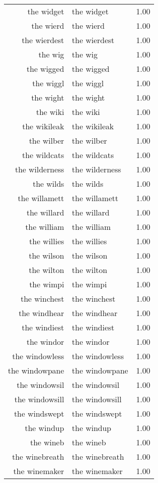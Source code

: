 \begin{table}[ht]
\begin{tabular}{rlr}
  the widget & the widget & 1.00 \\ 
  the wierd & the wierd & 1.00 \\ 
  the wierdest & the wierdest & 1.00 \\ 
  the wig & the wig & 1.00 \\ 
  the wigged & the wigged & 1.00 \\ 
  the wiggl & the wiggl & 1.00 \\ 
  the wight & the wight & 1.00 \\ 
  the wiki & the wiki & 1.00 \\ 
  the wikileak & the wikileak & 1.00 \\ 
  the wilber & the wilber & 1.00 \\ 
  the wildcats & the wildcats & 1.00 \\ 
  the wilderness & the wilderness & 1.00 \\ 
  the wilds & the wilds & 1.00 \\ 
  the willamett & the willamett & 1.00 \\ 
  the willard & the willard & 1.00 \\ 
  the william & the william & 1.00 \\ 
  the willies & the willies & 1.00 \\ 
  the wilson & the wilson & 1.00 \\ 
  the wilton & the wilton & 1.00 \\ 
  the wimpi & the wimpi & 1.00 \\ 
  the winchest & the winchest & 1.00 \\ 
  the windhear & the windhear & 1.00 \\ 
  the windiest & the windiest & 1.00 \\ 
  the windor & the windor & 1.00 \\ 
  the windowless & the windowless & 1.00 \\ 
  the windowpane & the windowpane & 1.00 \\ 
  the windowsil & the windowsil & 1.00 \\ 
  the windowsill & the windowsill & 1.00 \\ 
  the windswept & the windswept & 1.00 \\ 
  the windup & the windup & 1.00 \\ 
  the wineb & the wineb & 1.00 \\ 
  the winebreath & the winebreath & 1.00 \\ 
  the winemaker & the winemaker & 1.00 \\ 

\end{tabular}
\end{table}
